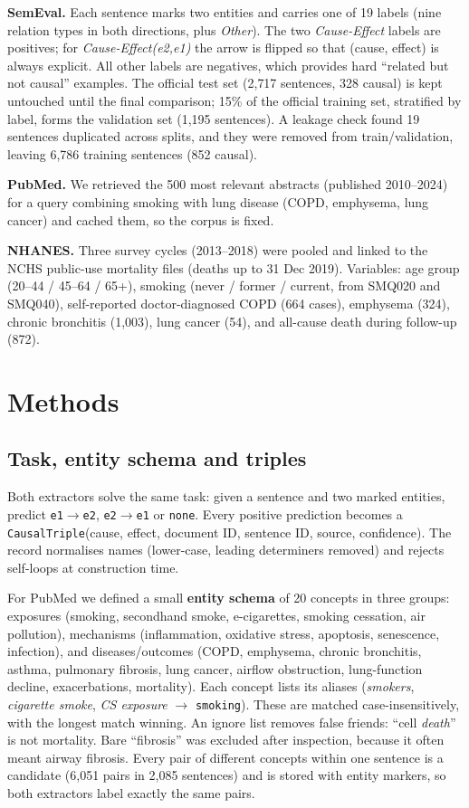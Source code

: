 \documentclass[11pt,a4paper]{article}
\begin{document}
\textbf{SemEval.} Each sentence marks two entities and carries one of 19 labels (nine relation types in both directions, plus
\textit{Other}). The two \textit{Cause-Effect} labels are positives; for \textit{Cause-Effect(e2,e1)} the arrow is flipped so that
(cause, effect) is always explicit. All other labels are negatives, which provides hard ``related but not causal'' examples. The
official test set (2{,}717 sentences, 328 causal) is kept untouched until the final comparison; 15\% of the official training set,
stratified by label, forms the validation set (1{,}195 sentences). A leakage check found 19 sentences duplicated across splits, and
they were removed from train/validation, leaving 6{,}786 training sentences (852 causal).

\textbf{PubMed.} We retrieved the 500 most relevant abstracts (published 2010--2024) for a query combining smoking with lung disease
(COPD, emphysema, lung cancer) and cached them, so the corpus is fixed.

\textbf{NHANES.} Three survey cycles (2013--2018) were pooled and linked to the NCHS public-use mortality files (deaths up to 31 Dec
2019). Variables: age group (20--44 / 45--64 / 65+), smoking (never / former / current, from SMQ020 and SMQ040), self-reported
doctor-diagnosed COPD (664 cases), emphysema (324), chronic bronchitis (1{,}003), lung cancer (54), and all-cause death during follow-up (872).

\section{Methods}

\subsection{Task, entity schema and triples}

Both extractors solve the same task: given a sentence and two marked entities, predict \texttt{e1$\rightarrow$e2},
\texttt{e2$\rightarrow$e1} or \texttt{none}. Every positive prediction becomes a \texttt{CausalTriple}(cause, effect, document ID,
sentence ID, source, confidence). The record normalises names (lower-case, leading determiners removed) and rejects self-loops at
construction time.

For PubMed we defined a small \textbf{entity schema} of 20 concepts in three groups: exposures (smoking, secondhand smoke,
e-cigarettes, smoking cessation, air pollution), mechanisms (inflammation, oxidative stress, apoptosis, senescence, infection), and
diseases/outcomes (COPD, emphysema, chronic bronchitis, asthma, pulmonary fibrosis, lung cancer, airflow obstruction, lung-function
decline, exacerbations, mortality). Each concept lists its aliases (\textit{smokers}, \textit{cigarette smoke}, \textit{CS exposure}
$\rightarrow$ \texttt{smoking}). These are matched case-insensitively, with the longest match winning. An ignore list removes false friends:
``cell \emph{death}'' is not mortality. Bare ``fibrosis'' was excluded after inspection, because it often meant airway fibrosis. Every pair of
different concepts within one sentence is a candidate (6{,}051 pairs in 2{,}085 sentences) and is stored with entity markers, so both
extractors label exactly the same pairs.
\end{document}
